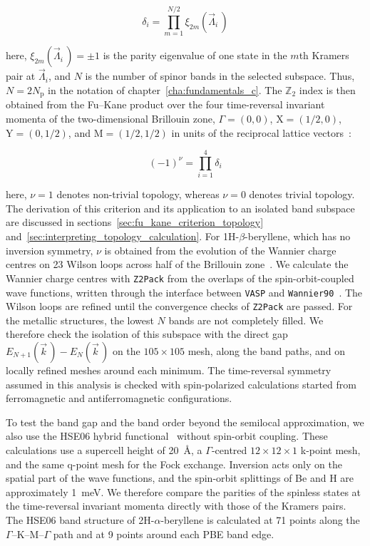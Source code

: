 \begin{equation}
    \delta_i =
    \prod_{m=1}^{N/2}
    \xi_{2m}(\vec{\Lambda}_i\,)
\label{eq:proj3_parity_product}
\end{equation}

here,
$\xi_{2m}(\vec{\Lambda}_i\,)=\pm1$ is the parity eigenvalue of one state in the $m$th Kramers pair at $\vec{\Lambda}_i$,
and $N$ is the number of spinor bands in the selected subspace.
Thus, $N=2N_\mathrm{p}$ in the notation of chapter~\ref{cha:fundamentals_c}.
The $\mathbb{Z}_2$ index is then obtained from the Fu--Kane product over the four time-reversal invariant momenta of the two-dimensional Brillouin zone,
$\Gamma=(0,0)$,
$\mathrm{X}=(1/2,0)$,
$\mathrm{Y}=(0,1/2)$,
and $\mathrm{M}=(1/2,1/2)$ in units of the reciprocal lattice vectors~\cite{fu2007topological,fu2007topological3d}:

\begin{equation}
    (-1)^{\nu} =
    \prod_{i=1}^{4} \delta_i
\label{eq:proj3_z2_index}
\end{equation}

here,
$\nu=1$ denotes non-trivial topology,
whereas $\nu=0$ denotes trivial topology.
The derivation of this criterion and its application to an isolated band subspace are discussed in sections~\ref{sec:fu_kane_criterion_topology} and~\ref{sec:interpreting_topology_calculation}.
For 1H-$\beta$-beryllene,
which has no inversion symmetry,
$\nu$ is obtained from the evolution of the Wannier charge centres on 23 Wilson loops across half of the Brillouin zone~\cite{soluyanov2011computing,gresch2017z2pack}.
We calculate the Wannier charge centres with \texttt{Z2Pack} from the overlaps of the spin-orbit-coupled wave functions,
written through the interface between \texttt{VASP} and \texttt{Wannier90}~\cite{pizzi2020wannier90}.
The Wilson loops are refined until the convergence checks of \texttt{Z2Pack} are passed.
For the metallic structures,
the lowest $N$ bands are not completely filled.
We therefore check the isolation of this subspace with the direct gap $E_{N+1}(\vec{k}\,)-E_{N}(\vec{k}\,)$ on the $105 \times 105$ mesh,
along the band paths,
and on locally refined meshes around each minimum.
The time-reversal symmetry assumed in this analysis is checked with spin-polarized calculations started from ferromagnetic and antiferromagnetic configurations.

To test the band gap and the band order beyond the semilocal approximation,
we also use the HSE06 hybrid functional~\cite{heyd2003hybrid,krukau2006influence} without spin-orbit coupling.
These calculations use a supercell height of \qty{20}{\angstrom},
a $\Gamma$-centred $12 \times 12 \times 1$ k-point mesh,
and the same q-point mesh for the Fock exchange.
Inversion acts only on the spatial part of the wave functions,
and the spin-orbit splittings of Be and H are approximately \qty{1}{\milli\electronvolt}.
We therefore compare the parities of the spinless states at the time-reversal invariant momenta directly with those of the Kramers pairs.
The HSE06 band structure of 2H-$\alpha$-beryllene is calculated at 71 points along the $\Gamma$--$\mathrm{K}$--$\mathrm{M}$--$\Gamma$ path and at 9 points around each PBE band edge.

